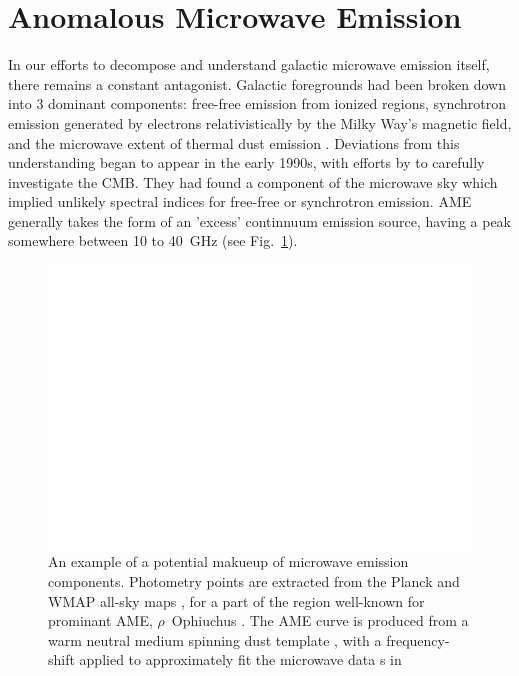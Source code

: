   \section{Anomalous Microwave Emission}
      In our efforts to decompose and understand galactic microwave emission itself, there remains a constant antagonist. Galactic foregrounds had been broken down into 3 dominant components: free-free emission from ionized regions, synchrotron emission generated by electrons relativistically by the Milky Way's magnetic field, and the microwave extent of thermal dust emission \citep{wmap03b, leach08, planckXII}. Deviations from this understanding began to appear in the early 1990s, with efforts by \cite{kogut96, leitch97} to carefully investigate the CMB. They had found a component of the microwave sky which implied unlikely spectral indices for free-free or synchrotron emission. AME generally takes the form of an 'excess' continnuum emission source, having a peak somewhere between 10 to 40~GHz (see Fig.~\ref{fig:mw_foregrounds_demo_rOph}).
            \begin{figure}
              \centering
              \includegraphics[width=\textwidth]{../Plots/ch_intro/mw_foregrounds_demo_rOph.pdf}
                \caption{An example of a potential makueup of microwave emission components. Photometry points are extracted from the Planck and WMAP all-sky maps \citep{hfi14viii}, for a part of the region well-known for prominant AME, $\rho$~Ophiuchus \citep{planckxx11}. The AME curve is produced from a warm neutral medium spinning dust template \citep{ali-haimoud09}, with a frequency-shift applied to approximately fit the microwave data s in \cite{planck15X}}
              \label{fig:mw_foregrounds_demo_rOph}
            \end{figure}

